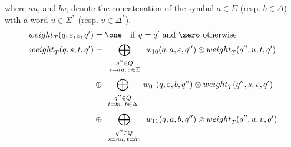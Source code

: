 where $au$, and $bv$, denote the concatenation
of the symbol $a \in \Sigma$ (resp. $b \in \Delta$)
with a word $u \in \Sigma^*$ (resp. $v \in \Delta^*$).
%
%
\begin{align}
\weight_T(q, \varepsilon, \varepsilon, q')  & = \one
 \quad \mathrm{if~} q = q' \mathrm{~and~} \zero \mathrm{~otherwise} \label{eq:SWT-weight}\\
\weight_T(q, s, t, q') & = \displaystyle\bigoplus_{\begin{array}{c}
                                                   \scriptstyle q'' \in Q\\[-1ex]
                                                   \scriptstyle s = au,\, a \in \Sigma
                                                   \end{array}}
    \wei_{10}(q, a, \varepsilon, q'') \otimes \weight_T(q'', u, t, q')\nonumber\\
                    & \oplus \displaystyle\bigoplus_{\begin{array}{c}
                                                     \scriptstyle q'' \in Q\\[-1ex]
                                                     \scriptstyle t = bv,\, b \in \Delta\\
                                                     \end{array}}
    \wei_{01}(q, \varepsilon, b, q'') \otimes \weight_T(q'', s, v, q')\nonumber\\
                    & \oplus \displaystyle\bigoplus_{\begin{array}{c}
                                                     \scriptstyle q'' \in Q\\[-1ex]
                                                     \scriptstyle s = au,\, t = bv\\
                                                     \end{array}}
    \wei_{11}(q, a, b, q'') \otimes \weight_T(q'', u, v, q')\nonumber
\end{align}


